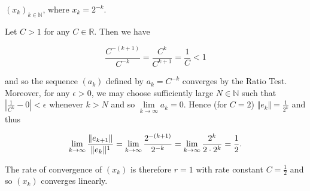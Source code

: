 $(x_k)_{k \in \mathbb{N}}$, where $x_k = 2^{-k}$.

\begin{solution}
  Let $C > 1$ for any $C \in \mathbb{R}$. Then we have

  $$
  \frac{C^{-(k+1)}}{C^{-k}} = \frac{C^k}{C^{k+1}} = \frac{1}{C} < 1
  $$

  and so the sequence $(a_k)$ defined by $a_k = C^{-k}$ converges by the Ratio Test. Moreover, for any $\epsilon > 0$,
  we may choose sufficiently large $N \in \mathbb{N}$ such that $\left|\frac{1}{C^{k}} - 0 \right| < \epsilon$ whenever 
  $k > N$ and so $\lim\limits_{k \to \infty} a_k = 0$. Hence (for $C = 2$) $\Vert e_{k} \Vert = \frac{1}{2^k}$ and thus

  $$
    \lim\limits_{k \to \infty} \frac{\Vert e_{k+1} \Vert}{\Vert e_k \Vert^1} 
        = \lim\limits_{k \to \infty} \frac{2^{-(k+1)}}{2^{-k}} \\
        = \lim\limits_{k \to \infty} \frac{2^k}{2 \cdot 2^k} \\
        = \frac{1}{2}.
  $$

  The rate of convergence of $(x_k)$ is therefore $r = 1$ with rate constant $C = \frac{1}{2}$ and so $(x_k)$ converges 
  linearly.
  \ \\
\end{solution}
